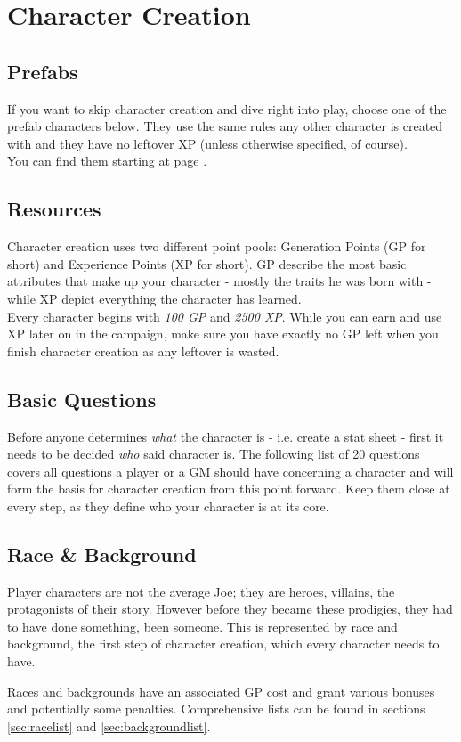 \documentclass[11pt,a4paper,openany,dvipsnames]{book}
\begin{document}
	\chapter{Character Creation}
	\section{Prefabs}
	If you want to skip character creation and dive right into play, choose one of the prefab characters below.
	They use the same rules any other character is created with
		and they have no leftover XP (unless otherwise specified, of course).
	\\
	You can find them starting at page \pageref{sec:pfchars}.

	\section{Resources}
	\label{sec:ccResources}
	Character creation uses two different point pools:
		Generation Points (GP for short) and Experience Points (XP for short).
	GP describe the most basic attributes that make up your character - mostly the traits he was born with - while XP depict everything the character has learned.\\
	Every character begins with \emph{100 GP} and \emph{2500 XP}. While you can earn and use XP later on in the campaign, make sure you have exactly no GP left when you finish character creation as any leftover is wasted.

	\section{Basic Questions}
	Before anyone determines \emph{what} the character is - i.e. create a stat sheet - first it needs to be decided \emph{who} said character is. The following list of 20 questions covers all questions a player or a GM should have concerning a character and will form the basis for character creation from this point forward. Keep them close at every step, as they define who your character is at its core.

	\begin{multicols}{2}
	\begin{enumerate}
	\end{enumerate}
	\end{multicols}

	\section{Race \& Background}
	Player characters are not the average Joe; they are heroes, villains, the protagonists of their story. However before they became these prodigies, they had to have done something, been someone. This is represented by race and background, the first step of character creation, which every character needs to have.\par
	Races and backgrounds have an associated GP cost and grant various bonuses and potentially some penalties. Comprehensive lists can be found in sections \ref{sec:racelist} and \ref{sec:backgroundlist}.
\end{document}
